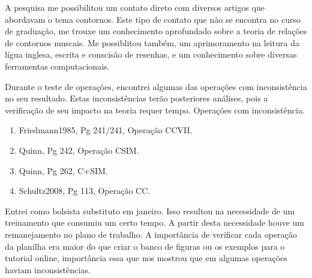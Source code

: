 \documentclass[11pt]{article}
\begin{document}
A pesquisa me possibilitou um contato direto com diversos artigos que abordavam
o tema contornos. Este tipo de contato que não se encontra no curso de graduação,
me trouxe um conhecimento aprofundado sobre a teoria de relações de contornos muscais.
Me possiblitou também, um aprimoramento na leitura da lígua inglesa, escrita e conscisão
de resenhas, e um conhecimento sobre diversas ferramentas computacionais.


Durante o teste de operações, encontrei algumas das operações com 
inconsistência no seu resultado. Estas inconsistências terão posteriores 
análises, pois a verificação de seu impacto na teoria requer tempo.
Operações com inconsistência.
\begin{enumerate}
\item Friedmann1985, Pg 241/241, Operação CCVII.
\item Quinn, Pg 242, Operação CSIM.
\item Quinn, Pg 262, C+SIM.
\item Schultz2008, Pg 113, Operação CC.
\end{enumerate}

Entrei como bolsista substituto em janeiro. Isso resultou na necessidade
de um treinamento que consumiu um certo tempo. A partir desta necessidade
houve um remanejamento no plano de trabalho. A importância de verificar cada operação
da planilha era maior do que criar o banco de figuras ou os exemplos para o
tutorial online, importância essa que nos mostrou que em algumas operações
haviam inconsistências.


\renewcommand{\refname}{Referências bibliográficas (máximo 15)}

\nocite{
  Friedmann1985,
  Friedmann1987,
  Morris1987,
  Marvin1987,
  Marvin1988,
  Polansky1992,
  Morris1993,
  Clifford1995,
  Quinn1997,
  Beard2003,
  Sampaio2008,
  Schultz2008,
  Schultz2009,
  Bor2009
}





\end{document}
